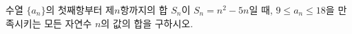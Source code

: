 수열 $\{a_n\}$의 첫째항부터 제$n$항까지의 합 $S_n$이 $S_n=n^2-5n$일 때, $9\le a_n\le 18$을 만족시키는 모든 자연수 $n$의 값의 합을 구하시오.
